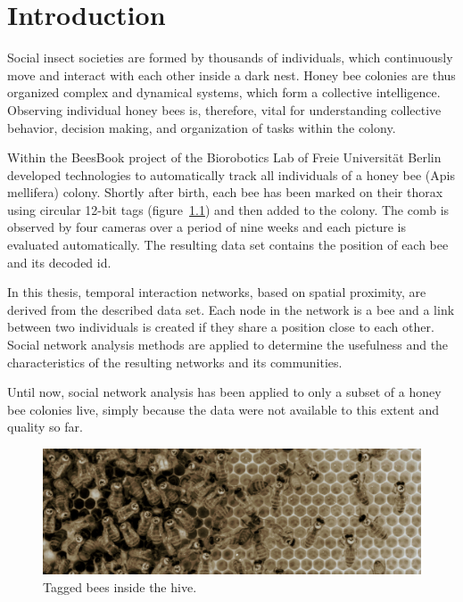 \chapter{Introduction}
\label{ch:intro}

Social insect societies are formed by thousands of individuals, which continuously move and interact with each other inside a dark nest. Honey bee colonies are thus organized complex and dynamical systems, which form a collective intelligence. Observing individual honey bees is, therefore, vital for understanding collective behavior, decision making, and organization of tasks within the colony.

Within the BeesBook project of the Biorobotics Lab of Freie Universität Berlin~\textcite{wario2015automatic} developed technologies to automatically track all individuals of a honey bee (Apis mellifera) colony. Shortly after birth, each bee has been marked on their thorax using circular 12-bit tags (figure~\ref{fig:markers}) and then added to the colony. The comb is observed by four cameras over a period of nine weeks and each picture is evaluated automatically. The resulting data set contains the position of each bee and its decoded id.

In this thesis, temporal interaction networks, based on spatial proximity, are derived from the described data set. Each node in the network is a bee and a link between two individuals is created if they share a position close to each other. Social network analysis methods are applied to determine the usefulness and the characteristics of the resulting networks and its communities.

Until now, social network analysis has been applied to only a subset of a honey bee colonies live, simply because the data were not available to this extent and quality so far.

\begin{figure}[htb]
	\centering
	\includegraphics[width=1.0\textwidth]{Figures/markers}
	\caption{Tagged bees inside the hive.}
	\label{fig:markers}
\end{figure}

